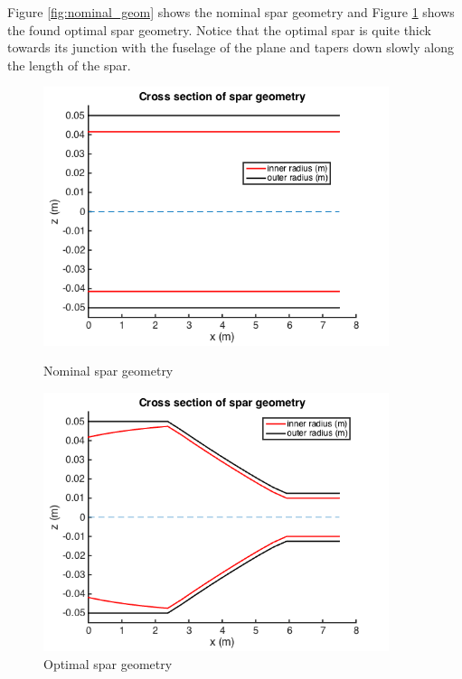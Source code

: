 \documentclass[10pt]{article}
\begin{document}
Figure \ref{fig:nominal_geom} shows the nominal spar geometry
and Figure \ref{fig:optimal_geom} shows the found optimal spar
geometry. Notice that the optimal spar is quite thick towards
its junction with the fuselage of the plane and tapers down
slowly along the length of the spar.
%
\begin{figure}[hbt!]
\centering
\begin{minipage}[b]{0.4\textwidth}
\includegraphics[width=0.9\textwidth]{nominal_geom}
\caption{Nominal spar geometry}
\label{fig:nominal_geom}
\end{minipage}
\begin{minipage}[b]{0.4\textwidth}
\includegraphics[width=0.9\textwidth]{optimal_geom}
\caption{Optimal spar geometry}
\label{fig:optimal_geom}
\end{minipage}
\end{figure}
\end{document}
